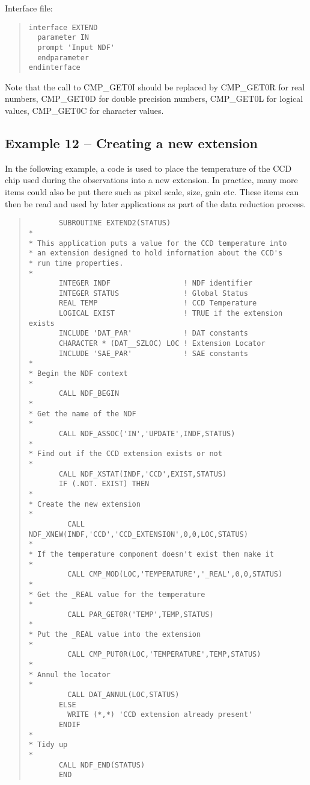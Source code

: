 Interface file:

\begin{quote}
{\small
\begin{verbatim}
interface EXTEND
  parameter IN
  prompt 'Input NDF'
  endparameter
endinterface
\end{verbatim}
}
\end{quote}

Note that the call to {\sf CMP\_GET0I} should be replaced by {\sf
CMP\_GET0R} for real numbers, {\sf CMP\_GET0D} for double precision numbers,
{\sf CMP\_GET0L} for logical values, {\sf CMP\_GET0C} for character values. 

\subsection{Example 12 -- Creating a new extension}

In the following example, a code is used to place the temperature of the CCD
chip used during the observations into a new extension. In practice, many 
more items could also be put there such as pixel scale, size, gain etc.
These items can then be read and used by later applications as part of 
the data reduction process.

\begin{quote}
{\small
\begin{verbatim}
       SUBROUTINE EXTEND2(STATUS)
*
* This application puts a value for the CCD temperature into
* an extension designed to hold information about the CCD's
* run time properties.
*
       INTEGER INDF                 ! NDF identifier
       INTEGER STATUS               ! Global Status
       REAL TEMP                    ! CCD Temperature
       LOGICAL EXIST                ! TRUE if the extension exists
       INCLUDE 'DAT_PAR'            ! DAT constants
       CHARACTER * (DAT__SZLOC) LOC ! Extension Locator
       INCLUDE 'SAE_PAR'            ! SAE constants
*
* Begin the NDF context
*
       CALL NDF_BEGIN
*
* Get the name of the NDF
*
       CALL NDF_ASSOC('IN','UPDATE',INDF,STATUS)
*
* Find out if the CCD extension exists or not
*
       CALL NDF_XSTAT(INDF,'CCD',EXIST,STATUS)
       IF (.NOT. EXIST) THEN
*
* Create the new extension
*
         CALL NDF_XNEW(INDF,'CCD','CCD_EXTENSION',0,0,LOC,STATUS)
*
* If the temperature component doesn't exist then make it
*
         CALL CMP_MOD(LOC,'TEMPERATURE','_REAL',0,0,STATUS)
*
* Get the _REAL value for the temperature
*
         CALL PAR_GET0R('TEMP',TEMP,STATUS)
*
* Put the _REAL value into the extension
*
         CALL CMP_PUT0R(LOC,'TEMPERATURE',TEMP,STATUS)
*
* Annul the locator
*
         CALL DAT_ANNUL(LOC,STATUS)
       ELSE
         WRITE (*,*) 'CCD extension already present' 
       ENDIF
*
* Tidy up
*
       CALL NDF_END(STATUS)
       END
\end{verbatim}
}
\end{quote}


